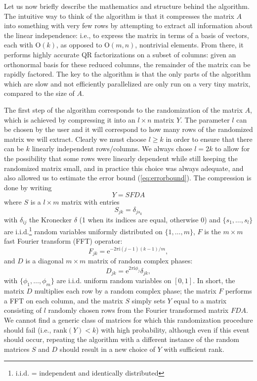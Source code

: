 \documentclass[11pt]{article}
\begin{document}
Let us now briefly describe the mathematics and structure behind the algorithm.    The intuitive way to think of the algorithm is that it compresses the matrix $A$ into something with very few rows by attempting to extract all information about the linear independence: i.e., to express the matrix in terms of a basis of vectors, each with $\mathrm{O}(k)$, as opposed to $\mathrm{O}(m,n)$, nontrivial elements.  From there, it performs highly accurate QR factorizations on a subset of columns: given an orthonormal basis for these reduced columns, the remainder of the matrix can be rapidly factored.  The key to the algorithm is that the only parts of the algorithm which are slow and not efficiently parallelized are only run on a very tiny matrix, compared to the size of $A$.

The first step of the algorithm corresponds to the randomization of the matrix $A$, which is achieved by compressing it into an $l\times n$ matrix $Y$.  The parameter $l$ can be chosen by the user and it will correspond to how many rows of the randomized matrix we will extract.  Clearly we must choose $l\ge k$ in order to ensure that there can be $k$ linearly independent rows/columns.   We always chose $l=2k$ to allow for the possibility that some rows were linearly dependent while still keeping the randomized matrix small, and in practice this choice was always adequate, and also allowed us to estimate the error bound (\ref{eq:errorbound}).  The compression is done by writing \begin{equation}
Y=SFDA
\end{equation}
where $S$ is a $l\times m$ matrix with entries
\begin{equation}
S_{jk} = \delta_{js_k}
\end{equation}with $\delta_{ij}$ the Kronecker $\delta$ (1 when its indices are equal, otherwise 0) and $\lbrace s_1,\ldots, s_l\rbrace$ are i.i.d.\footnote{i.i.d. = independent and identically distributed} random variables uniformly distributed on $\lbrace 1,\ldots,m\rbrace$, $F$ is the $m\times m$ fast Fourier transform (FFT) operator:\begin{equation}
F_{jk} = \mathrm{e}^{-2\pi\mathrm{i}(j-1)(k-1)/m},
\end{equation} and $D$ is a diagonal $m\times m$ matrix of random complex phases: \begin{equation}
D_{jk} = \mathrm{e}^{2\pi \mathrm{i}\phi_j} \delta_{jk} ,
\end{equation}
with $\lbrace \phi_1,\ldots, \phi_m\rbrace$ are i.i.d. uniform random variables on $[0,1]$.    In short, the matrix $D$ multiplies each row by a random complex phase; the matrix $F$ performs a FFT on each column, and the matrix $S$ simply sets $Y$ equal to a matrix consisting of $l$ randomly chosen rows from the Fourier transformed matrix $FDA$.   We cannot find a generic class of matrices for which this randomization procedure should fail (i.e., $\mathrm{rank}(Y) < k$) with high probability, although even if this event should occur, repeating the algorithm with a different instance of the random matrices $S$ and $D$ should result in a new choice of $Y$ with sufficient rank.
\end{document}
